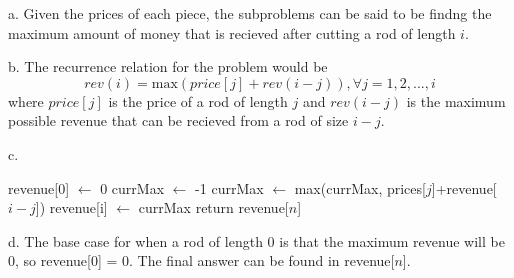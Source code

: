 \documentclass[12pt]{article}
\begin{document}
a. Given the prices of each piece, the subproblems can be said to be findng the maximum amount of money that is recieved after cutting a rod of length $i$.

b. The recurrence relation for the problem would be 
$$
rev(i) = \text{max}(price[j] + rev(i-j)), \forall j = 1,2, ..., i
$$
where $price[j]$ is the price of a rod of length $j$ and $rev(i-j)$ is the maximum possible revenue that can be recieved from a rod of size $i-j$.

c. 
\begin{algorithmic}
        \State revenue[0] $\gets$ 0
            \State currMax $\gets$ -1
                \State currMax $\gets$ max(currMax, prices[$j$]+revenue[$i-j$])
            \EndFor
            \State revenue[i] $\gets$ currMax
        \EndFor
        \State return revenue[$n$]
    \EndProcedure
\end{algorithmic}

d. The base case for when a rod of length 0 is that the maximum revenue will be 0, so revenue[0] = 0. The final answer can be found in revenue[$n$]. 
\end{document}

